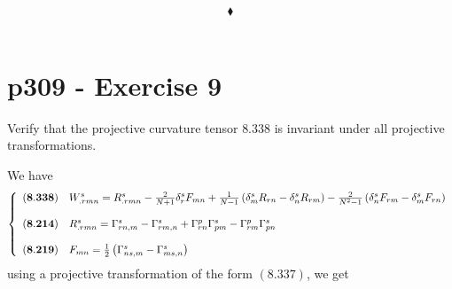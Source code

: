 $$\blacklozenge$$\\
\newpage


\section{p309 - Exercise 9}
\begin{tcolorbox}
Verify that the projective curvature tensor $\mathbf{8.338}$ is invariant under all projective transformations.
\end{tcolorbox}
We have
\begin{align}
\left\{\begin{array}{ll}
\mathbf{(8.338)}&W^s_{.rmn}=R^s_{.rmn}-\frac{2}{N+1}\delta_r^s F_{mn}+\frac{1}{N-1}\left(\delta^s_m R_{rn}-\delta^s_n R_{rm}\right)-\frac{2}{N^2-1}\left(\delta^s_n F_{rm}-\delta^s_mF_{rn}\right)\\\\
\mathbf{(8.214)}&R^{s}_{.rmn} = \Gamma^{s}_{rn,m} - \Gamma^{s}_{rm,n}+\Gamma^{p}_{rn}\Gamma^{s}_{pm}-\Gamma^{p}_{rm}\Gamma^{s}_{pn}\\\\
\mathbf{(8.219)}&F_{mn} = \frac{1}{2}\left(\Gamma^{s}_{ns,m} - \Gamma^{s}_{ms,n}\right)\\
\end{array}
\right.
\end{align}
using a projective transformation of the form $\mathbf{(8.337)}$, we get 

